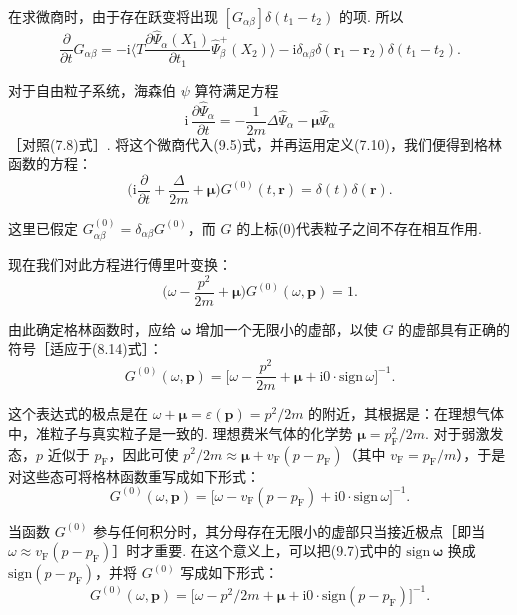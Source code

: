 在求微商时，由于存在跃变将出现 $[G_{\alpha\beta}]\delta(t_1-t_2)$ 的项. 所以
\begin{equation}
\frac{\partial}{\partial t}G_{\alpha\beta}=-\mathrm{i}\Big\langle T\frac{\partial\hat\Psi_\alpha(X_1)}{\partial t_1}\hat\Psi^{+}_\beta(X_2)\Big\rangle-\mathrm{i}\delta_{\alpha\beta}\delta(\bm r_1-\bm r_2)\delta(t_1-t_2).
\end{equation}

对于自由粒子系统，海森伯 $\psi$ 算符满足方程
\begin{equation*}
\mathrm{i}\,\frac{\partial\hat\Psi_\alpha}{\partial t}=-\frac{1}{2m}\Delta\hat\Psi_\alpha-\bm\mu\hat\Psi_\alpha
\end{equation*}
［对照(7.8)式］. 将这个微商代入(9.5)式，并再运用定义(7.10)，我们便得到格林函数的方程：
\begin{equation}
\Big(\mathrm{i}\frac{\partial}{\partial t}+\frac{\Delta}{2m}+\bm\mu\Big)G^{(0)}(t,\bm r)=\delta(t)\delta(\bm r).
\end{equation}

这里已假定 $G^{(0)}_{\alpha\beta}=\delta_{\alpha\beta}G^{(0)}$，而 $G$ 的上标(0)代表粒子之间不存在相互作用.

现在我们对此方程进行傅里叶变换：
\begin{equation*}
\Big(\omega-\frac{p^2}{2m}+\bm\mu\Big)G^{(0)}(\omega,\bm p)=1.
\end{equation*}

由此确定格林函数时，应给 $\bm\omega$ 增加一个无限小的虚部，以使 $G$ 的虚部具有正确的符号［适应于(8.14)式］：
\begin{equation}
G^{(0)}(\omega,\bm p)=\Big[\omega-\frac{p^2}{2m}+\bm\mu+\mathrm{i}0\cdot\mathrm{sign}\,\omega\Big]^{-1}.
\end{equation}

这个表达式的极点是在 $\omega+\bm\mu=\varepsilon(\bm p)=p^2/2m$ 的附近，其根据是：在理想气体中，准粒子与真实粒子是一致的. 理想费米气体的化学势 $\bm\mu=p_{\mathrm F}^2/2m$. 对于弱激发态，$p$ 近似于 $p_{\mathrm F}$，因此可使 $p^2/2m\approx\bm\mu+v_{\mathrm F}(p-p_{\mathrm F})$（其中 $v_{\mathrm F}=p_{\mathrm F}/m$），于是对这些态可将格林函数重写成如下形式：
\begin{equation}
G^{(0)}(\omega,\bm p)=\big[\omega-v_{\mathrm F}(p-p_{\mathrm F})+\mathrm{i}0\cdot\mathrm{sign}\,\omega\big]^{-1}.
\end{equation}

当函数 $G^{(0)}$ 参与任何积分时，其分母存在无限小的虚部只当接近极点［即当 $\omega\approx v_{\mathrm F}(p-p_{\mathrm F})$］时才重要. 在这个意义上，可以把(9.7)式中的 $\mathrm{sign}\,\bm\omega$ 换成 $\mathrm{sign}(p-p_{\mathrm F})$，并将 $G^{(0)}$ 写成如下形式：
\begin{equation}
G^{(0)}(\omega,\bm p)=\big[\omega-p^2/2m+\bm\mu+\mathrm{i}0\cdot\mathrm{sign}(p-p_{\mathrm F})\big]^{-1}.
\end{equation}

